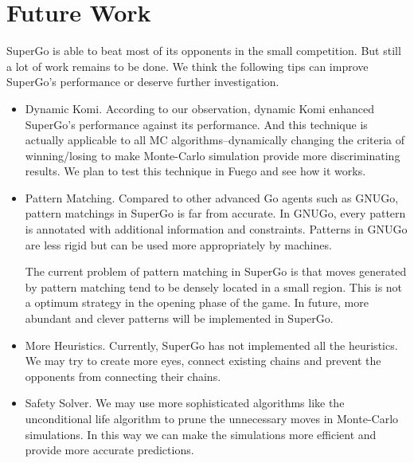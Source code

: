 \section{Future Work}
SuperGo is able to beat most of its opponents in the small competition. But still a lot of work remains to be done. We think the following tips can improve SuperGo's performance or deserve further investigation.

\begin{itemize}
\item Dynamic Komi. According to our observation, dynamic Komi enhanced SuperGo's performance against its performance. And this technique is actually applicable to all MC algorithms--dynamically changing the criteria of winning/losing to make Monte-Carlo simulation provide more discriminating results. We plan to test this technique in Fuego and see how it works.

\item Pattern Matching. Compared to other advanced Go agents such as GNUGo, pattern matchings in SuperGo is far from accurate. In GNUGo, every pattern is annotated with additional information and constraints. Patterns in GNUGo are less rigid but can be used more appropriately by machines. 

The current problem of pattern matching in SuperGo is that moves generated by pattern matching tend to be densely located in a small region. This is not a optimum strategy in the opening phase of the game.
In future, more abundant and clever patterns will be implemented in SuperGo.

\item More Heuristics. Currently, SuperGo has not implemented all the heuristics. We may try to create more eyes, connect existing chains and prevent the opponents from connecting their chains.

\item Safety Solver. We may use more sophisticated algorithms like the unconditional life algorithm to prune the unnecessary moves in Monte-Carlo simulations. In this way we can make the simulations more efficient and provide more accurate predictions. 

\end{itemize}
